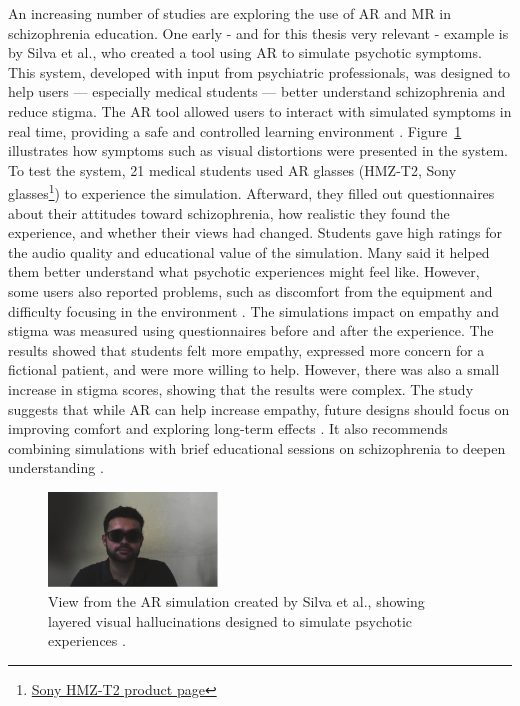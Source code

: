 An increasing number of studies are exploring the use of AR and MR in schizophrenia education. One early - and for this thesis very relevant - example is by Silva et al., who created a tool using AR to simulate psychotic symptoms. This system, developed with input from psychiatric professionals, was designed to help users — especially medical students — better understand schizophrenia and reduce stigma. The AR tool allowed users to interact with simulated symptoms in real time, providing a safe and controlled learning environment \cite{Silva2017}. Figure~\ref{fig:silva_ar_scene} illustrates how symptoms such as visual distortions were presented in the system. To test the system, 21 medical students used AR glasses (HMZ-T2, Sony glasses\footnote{\href{https://www.vrbrillen.net/sony-hmz-t2/}{Sony HMZ-T2 product page}}) to experience the simulation. Afterward, they filled out questionnaires about their attitudes toward schizophrenia, how realistic they found the experience, and whether their views had changed. Students gave high ratings for the audio quality and educational value of the simulation. Many said it helped them better understand what psychotic experiences might feel like. However, some users also reported problems, such as discomfort from the equipment and difficulty focusing in the environment \cite{Silva2017}. The simulations impact on empathy and stigma was measured using questionnaires before and after the experience. The results showed that students felt more empathy, expressed more concern for a fictional patient, and were more willing to help. However, there was also a small increase in stigma scores, showing that the results were complex. The study suggests that while AR can help increase empathy, future designs should focus on improving comfort and exploring long-term effects \cite{Silva2017}. It also recommends combining simulations with brief educational sessions on schizophrenia to deepen understanding \cite{Silva2017}. 


\begin{figure}[H]
  \centering
  \includegraphics[width=0.4\textwidth]{../../Figures/silva_ar_scene.png}
  \caption{View from the AR simulation created by Silva et al., showing layered visual hallucinations designed to simulate psychotic experiences \cite{Silva2017}.}
  \label{fig:silva_ar_scene}
\end{figure}


